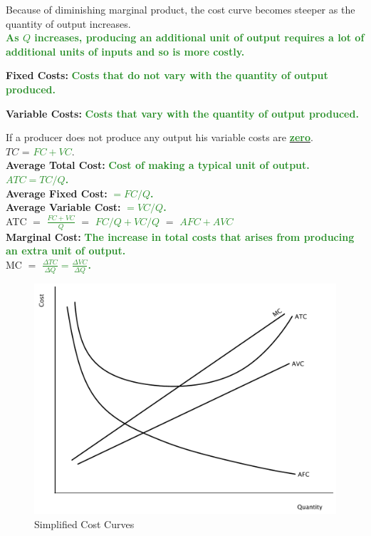 \documentclass[11pt]{article}\usepackage[]{graphicx}\usepackage[]{color}
\theoremstyle{definition}
\newcommand{\ddp}[1]{{\textbf{\textcolor{ForestGreen}{#1}}}}
\newcommand{\dd}[1]{{\underline{\textbf{\textcolor{ForestGreen}{#1}}}}}
\newcommand{\defn}[1]{\textbf{#1}}
\begin{document}
	Because of diminishing marginal product, the cost curve becomes steeper as the quantity of output increases. 
	\\
	
	\ddp{As $Q$ increases, producing an additional unit of output requires a lot of additional units of inputs and so is more costly. \\}
	
	\defn{Fixed Costs:} \ddp{Costs that do not vary with the quantity of output produced.\\}

	
	\defn{Variable Costs:} \ddp{Costs that vary with the quantity of output produced.\\}

	
	If a producer does not produce any output his variable costs are \dd{zero}.
	\\
	
	$TC$ = \dd{$FC + VC$}.
	\\
	
	
	
	\defn{Average Total Cost:} \ddp{Cost of making a typical unit of output. $ATC = TC/Q$.}
	\\
	
	\defn{Average Fixed Cost:} \ddp{$=FC/Q$.}
	\\
	
	\defn{Average Variable Cost:} \ddp{$=VC/Q$.}
	\\
	
	ATC $=$ \dd{$\frac{FC + VC}{Q}$} $=$ \dd{$FC/Q + VC/Q$} $=$ \dd{$AFC + AVC$}
	\\
	
	\defn{Marginal Cost:} \ddp{The increase in total costs that arises from producing an extra unit of output.}
	\\
	
	MC $=$ \ddp{$\frac{\Delta TC}{\Delta Q} = \frac{\Delta VC}{\Delta Q}$.} 
	\\
	
	\begin{figure}[H]
		\centering
		\includegraphics[scale=.35]{plot57.pdf}
		\caption{Simplified Cost Curves}
	\end{figure}
	
\end{document}
